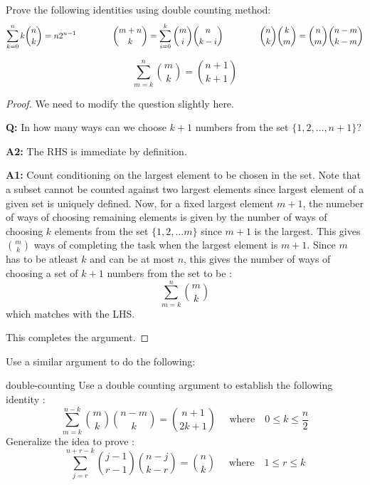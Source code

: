 \begin{exercise}
Prove the following identities using double counting method:
$$\sum_{k=0}^n k {n \choose k} = n 2^{n-1} \textrm{\hspace{15mm}} {m+n \choose k} = \sum_{i=0}^k {m \choose i}{n \choose k-i} \textrm{\hspace{15mm}} {n \choose k}{k \choose m} = {n \choose m}{n-m \choose k-m}$$
\end{exercise}

\begin{proposition}
$$\sum_{m=k}^n {m \choose k} = {n+1 \choose k+1}$$
\end{proposition}
\begin{proof}
We need to modify the question slightly here.
\begin{description}
\item{\bf Q:} In how many ways can we choose $k+1$ numbers from the set $\{1, 2, \ldots, n+1\}$?
\item{\bf A2:} The RHS is immediate by definition.
\item{\bf  A1:} Count conditioning on the largest element to be chosen in the set. Note that a subset cannot be counted against two largest elements since largest element of a given set is uniquely defined. Now, for a fixed largest element $m+1$, the numeber of ways of choosing remaining elements is given by the number of ways of choosing $k$ elements from the set $\{1, 2, \ldots m\}$ since $m+1$ is the largest. This gives ${m \choose k}$ ways of completing the task when the largest element is $m+1$. Since $m$ has to be atleast $k$ and can be at most $n$, this gives the number of ways of choosing a set of $k+1$ numbers from the set to be :
$$\sum_{m=k}^n {m \choose k}$$
which matches with the LHS.
\end{description}
This completes the argument.
\end{proof}
Use a similar argument to do the following:


\begin{exercise-prob}
\begin{show-ps1}{double-counting}
Use a double counting argument to establish the following identity : \\
$$ \sum_{m=k}^{n-k} {m \choose k} {n-m \choose k} = {n+1 \choose 2k+1} \textrm{ ~~~where~~ $0 \le k \le \frac{n}{2}$}
$$
Generalize the idea to prove :
$$ \sum_{j=r}^{n+r-k} {j-1 \choose r-1} {n-j \choose k-r} = {n \choose k} \textrm{ ~~~where~~ $1 \le r \le k$}
$$
\end{show-ps1}
\end{exercise-prob}